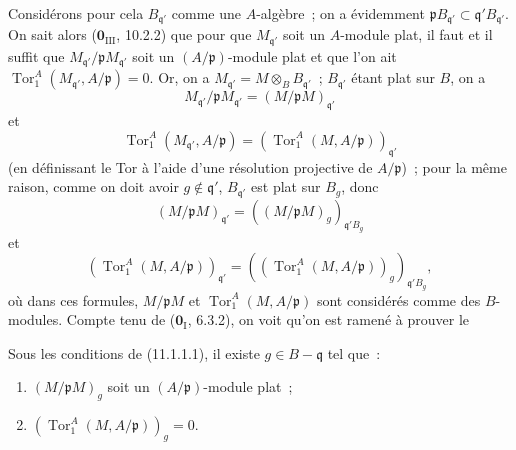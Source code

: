 Considérons pour cela $B_{\mathfrak q'}$ comme une $A$-algèbre~; on a
évidemment
$\mathfrak pB_{\mathfrak q'}\subset\mathfrak q'B_{\mathfrak q'}$. On sait
alors ($\mathbf 0_{\mathrm{III}}$, 10.2.2) que pour que $M_{\mathfrak q'}$ soit
un $A$-module plat, il faut et il suffit que
$M_{\mathfrak q'}/\mathfrak pM_{\mathfrak q'}$ soit un
$(A/\mathfrak p)$-module plat et que l'on ait
$\operatorname{Tor}_1^A(M_{\mathfrak q'},A/\mathfrak p)=0$. Or, on a
$M_{\mathfrak q'}=M\otimes_BB_{\mathfrak q'}$~; $B_{\mathfrak q'}$ étant plat
sur $B$, on a
\[
  M_{\mathfrak q'}/\mathfrak pM_{\mathfrak q'}
  =(M/\mathfrak pM)_{\mathfrak q'}
\]
et
\[
  \operatorname{Tor}_1^A(M_{\mathfrak q'},A/\mathfrak p)
  =(\operatorname{Tor}_1^A(M,A/\mathfrak p))_{\mathfrak q'}
\]
(en définissant le Tor à l'aide d'une résolution projective de
$A/\mathfrak p$)~; pour la même raison, comme on doit avoir
$g\notin\mathfrak q'$, $B_{\mathfrak q'}$ est plat sur $B_g$, donc
\[
  (M/\mathfrak pM)_{\mathfrak q'}
  =((M/\mathfrak pM)_g)_{\mathfrak q'B_g}
\]
et
\[
  (\operatorname{Tor}_1^A(M,A/\mathfrak p))_{\mathfrak q'}
  =((\operatorname{Tor}_1^A(M,A/\mathfrak p))_g)_{\mathfrak q'B_g},
\]
où dans ces formules, $M/\mathfrak pM$ et
$\operatorname{Tor}_1^A(M,A/\mathfrak p)$ sont considérés comme des
$B$-modules. Compte tenu de ($\mathbf 0_{\mathrm I}$, 6.3.2), on voit qu'on
est ramené à prouver le

\begin{lemma}[11.1.1.2]
\label{IV.11.1.1.2-fr}
Sous les conditions de (11.1.1.1), il existe $g\in B-\mathfrak q$ tel que~:
\begin{enumerate}[label=(\roman*)]
  \item $(M/\mathfrak pM)_g$ soit un $(A/\mathfrak p)$-module plat~;
  \item $(\operatorname{Tor}_1^A(M,A/\mathfrak p))_g=0$.
\end{enumerate}
\end{lemma}


